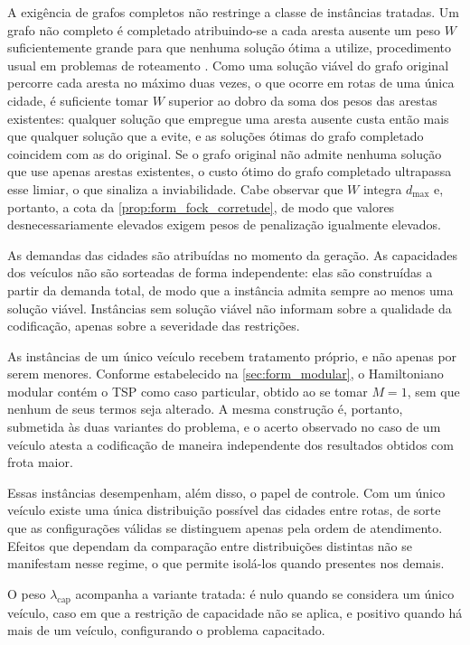     A exigência de grafos completos não restringe a classe de instâncias tratadas. Um grafo não completo é completado atribuindo-se a cada aresta ausente um peso $W$ suficientemente grande para que nenhuma solução ótima a utilize, procedimento usual em problemas de roteamento \cite{reinelt2001traveling, hahsler2008tsp}. Como uma solução viável do grafo original percorre cada aresta no máximo duas vezes, o que ocorre em rotas de uma única cidade, é suficiente tomar $W$ superior ao dobro da soma dos pesos das arestas existentes: qualquer solução que empregue uma aresta ausente custa então mais que qualquer solução que a evite, e as soluções ótimas do grafo completado coincidem com as do original. Se o grafo original não admite nenhuma solução que use apenas arestas existentes, o custo ótimo do grafo completado ultrapassa esse limiar, o que sinaliza a inviabilidade. Cabe observar que $W$ integra $d_{\max}$ e, portanto, a cota da \autoref{prop:form_fock_corretude}, de modo que valores desnecessariamente elevados exigem pesos de penalização igualmente elevados.

    As demandas das cidades são atribuídas no momento da geração. As capacidades dos veículos não são sorteadas de forma independente: elas são construídas a partir da demanda total, de modo que a instância admita sempre ao menos uma solução viável. Instâncias sem solução viável não informam sobre a qualidade da codificação, apenas sobre a severidade das restrições.

    As instâncias de um único veículo recebem tratamento próprio, e não apenas por serem menores. Conforme estabelecido na \autoref{sec:form_modular}, o Hamiltoniano modular contém o TSP como caso particular, obtido ao se tomar $M = 1$, sem que nenhum de seus termos seja alterado. A mesma construção é, portanto, submetida às duas variantes do problema, e o acerto observado no caso de um veículo atesta a codificação de maneira independente dos resultados obtidos com frota maior.

    Essas instâncias desempenham, além disso, o papel de controle. Com um único veículo existe uma única distribuição possível das cidades entre rotas, de sorte que as configurações válidas se distinguem apenas pela ordem de atendimento. Efeitos que dependam da comparação entre distribuições distintas não se manifestam nesse regime, o que permite isolá-los quando presentes nos demais.

    O peso $\lambda_{\text{cap}}$ acompanha a variante tratada: é nulo quando se considera um único veículo, caso em que a restrição de capacidade não se aplica, e positivo quando há mais de um veículo, configurando o problema capacitado.


